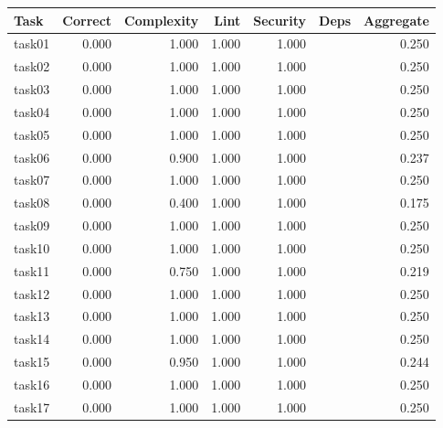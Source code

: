 \begin{tabular}{lrrrrrr}
\toprule
Task & Correct & Complexity & Lint & Security & Deps & Aggregate \\
\midrule
task01 & 0.000 & 1.000 & 1.000 & 1.000 &  & 0.250 \\
task02 & 0.000 & 1.000 & 1.000 & 1.000 &  & 0.250 \\
task03 & 0.000 & 1.000 & 1.000 & 1.000 &  & 0.250 \\
task04 & 0.000 & 1.000 & 1.000 & 1.000 &  & 0.250 \\
task05 & 0.000 & 1.000 & 1.000 & 1.000 &  & 0.250 \\
task06 & 0.000 & 0.900 & 1.000 & 1.000 &  & 0.237 \\
task07 & 0.000 & 1.000 & 1.000 & 1.000 &  & 0.250 \\
task08 & 0.000 & 0.400 & 1.000 & 1.000 &  & 0.175 \\
task09 & 0.000 & 1.000 & 1.000 & 1.000 &  & 0.250 \\
task10 & 0.000 & 1.000 & 1.000 & 1.000 &  & 0.250 \\
task11 & 0.000 & 0.750 & 1.000 & 1.000 &  & 0.219 \\
task12 & 0.000 & 1.000 & 1.000 & 1.000 &  & 0.250 \\
task13 & 0.000 & 1.000 & 1.000 & 1.000 &  & 0.250 \\
task14 & 0.000 & 1.000 & 1.000 & 1.000 &  & 0.250 \\
task15 & 0.000 & 0.950 & 1.000 & 1.000 &  & 0.244 \\
task16 & 0.000 & 1.000 & 1.000 & 1.000 &  & 0.250 \\
task17 & 0.000 & 1.000 & 1.000 & 1.000 &  & 0.250 \\
\bottomrule
\end{tabular}

